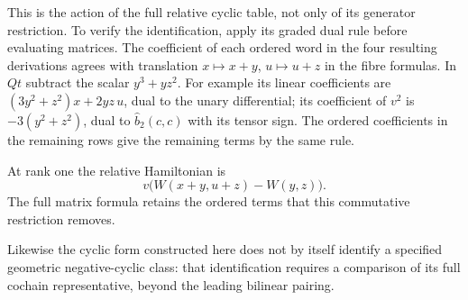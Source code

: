 This is the action of the full relative cyclic table, not only
of its generator restriction. To verify the identification,
apply its graded dual rule before evaluating matrices.
The coefficient of each ordered word in the four resulting
derivations agrees with translation \(x\mapsto x+y\),
\(u\mapsto u+z\) in the fibre formulas. In \(Qt\) subtract
the scalar \(y^3+yz^2\). For example its linear coefficients
are \((3y^2+z^2)x+2yz\,u\), dual to the unary differential;
its coefficient of \(v^2\) is \(-3(y^2+z^2)\), dual to
\(\widehat b_2(c,c)\) with its tensor sign. The ordered
coefficients in the remaining rows give the remaining
terms by the same rule.

At rank one the relative Hamiltonian is
\[
 v\bigl(W(x+y,u+z)-W(y,z)\bigr).
\]
The full matrix formula retains the ordered terms that this
commutative restriction removes.

Likewise the cyclic form constructed here does not by itself
identify a specified geometric negative-cyclic class: that
identification requires a comparison of its full cochain
representative, beyond the leading bilinear pairing.
